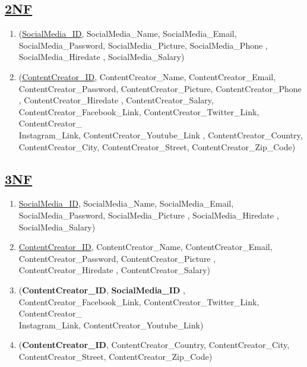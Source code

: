 \subsection*{\underline{2NF}}
\begin{enumerate}
    \item  (\underline{SocialMedia\_ID}, SocialMedia\_Name, SocialMedia\_Email, SocialMedia\_Password, SocialMedia\_Picture, SocialMedia\_Phone , SocialMedia\_Hiredate , SocialMedia\_Salary)
    \item  (\underline{ContentCreator\_ID}, ContentCreator\_Name, ContentCreator\_Email, ContentCreator\_Password, ContentCreator\_Picture, ContentCreator\_Phone , ContentCreator\_Hiredate , ContentCreator\_Salary,
          ContentCreator\_Facebook\_Link, ContentCreator\_Twitter\_Link, ContentCreator\_\\Instagram\_Link, ContentCreator\_Youtube\_Link ,
          ContentCreator\_Country, ContentCreator\_City, ContentCreator\_Street, ContentCreator\_Zip\_Code)
\end{enumerate}

\subsection*{\underline{3NF}}

\begin{enumerate}
    \item  \underline{SocialMedia\_ID}, SocialMedia\_Name, SocialMedia\_Email, SocialMedia\_Password, SocialMedia\_Picture , SocialMedia\_Hiredate , SocialMedia\_Salary)
    \item  \underline{ContentCreator\_ID}, ContentCreator\_Name, ContentCreator\_Email, ContentCreator\_Password, ContentCreator\_Picture , ContentCreator\_Hiredate , ContentCreator\_Salary)
    \item (\textbf{ContentCreator\_ID}, \textbf{SocialMedia\_ID} , ContentCreator\_Facebook\_Link, ContentCreator\_Twitter\_Link, ContentCreator\_\\Instagram\_Link, ContentCreator\_Youtube\_Link)
    \item  (\textbf{ContentCreator\_ID}, ContentCreator\_Country, ContentCreator\_City, ContentCreator\_Street, ContentCreator\_Zip\_Code)
\end{enumerate}

